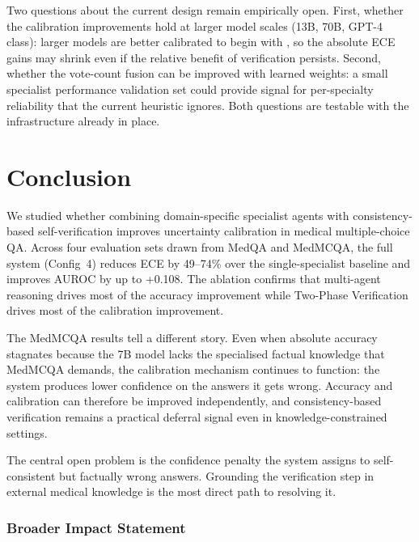 \documentclass[10pt]{article}
\begin{document}
Two questions about the current design remain empirically open.  First,
whether the calibration improvements hold at larger model scales (13B, 70B,
GPT-4 class): larger models are better calibrated to begin with
\citep{kadavath2022language}, so the absolute ECE gains may shrink even if
the relative benefit of verification persists.  Second, whether the
vote-count fusion can be improved with learned weights: a small specialist
performance validation set could provide signal for per-specialty reliability
that the current heuristic ignores.  Both questions are testable with the
infrastructure already in place.

\section{Conclusion}
\label{sec:conclusion}

We studied whether combining domain-specific specialist agents with
consistency-based self-verification improves uncertainty calibration in
medical multiple-choice QA.  Across four evaluation sets drawn from MedQA
and MedMCQA, the full system (Config~4) reduces ECE by 49--74\% over the
single-specialist baseline and improves AUROC by up to +0.108.  The
ablation confirms that multi-agent reasoning drives most of the accuracy
improvement while Two-Phase Verification drives most of the calibration
improvement.

The MedMCQA results tell a different story.  Even when absolute accuracy
stagnates because the 7B model lacks the specialised factual knowledge that
MedMCQA demands, the calibration mechanism continues to function: the system
produces lower confidence on the answers it gets wrong.  Accuracy and
calibration can therefore be improved independently, and consistency-based
verification remains a practical deferral signal even in knowledge-constrained
settings.

The central open problem is the confidence penalty the system assigns to
self-consistent but factually wrong answers.  Grounding the verification step
in external medical knowledge is the most direct path to resolving it.

\subsubsection*{Broader Impact Statement}
\end{document}
